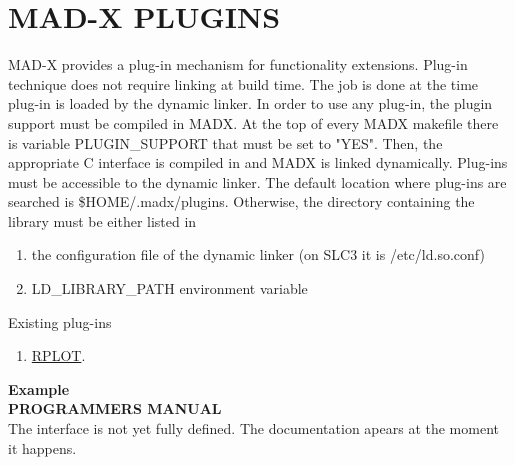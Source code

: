 
\section{MAD-X PLUGINS}

MAD-X provides a plug-in mechanism for functionality extensions. Plug-in
technique does not require linking at build time. The job is done at the
time plug-in is loaded by the dynamic linker.  In order to use any
plug-in, the plugin support must be compiled in MADX. At the top of
every MADX makefile there is variable PLUGIN\_SUPPORT that must be set
to "YES".  Then, the appropriate C interface is compiled in and MADX is
linked dynamically.   Plug-ins must be accessible to the dynamic linker.
The default location where plug-ins are searched is
\$HOME/.madx/plugins. Otherwise, the directory containing the library
must be either listed in   
\begin{enumerate}
   \item  the configuration file of the dynamic linker (on SLC3 it is
     /etc/ld.so.conf)  
   \item  LD\_LIBRARY\_PATH environment variable 
\end{enumerate}

Existing plug-ins  
\begin{enumerate}
   \item \href{rplot/index.html}{RPLOT}.
\end{enumerate}

\textbf{ Example }\\

\textbf{ PROGRAMMERS MANUAL  }\\

The interface is not yet fully defined. The documentation apears at the moment it happens.   


